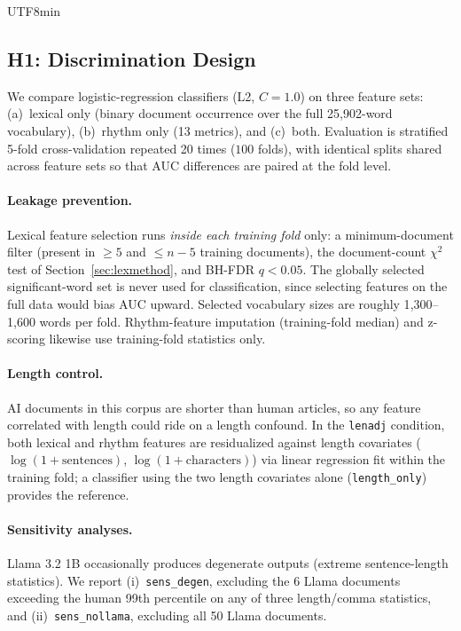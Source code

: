 \documentclass[11pt,a4paper]{article}
\begin{document}
\begin{CJK}{UTF8}{min}
\subsection{H1: Discrimination Design}
\label{sec:h1method}

We compare logistic-regression classifiers (L2, $C=1.0$) on three feature sets: (a)~lexical only (binary document occurrence over the full 25{,}902-word vocabulary), (b)~rhythm only (13 metrics), and (c)~both. Evaluation is stratified 5-fold cross-validation repeated 20 times ($100$ folds), with identical splits shared across feature sets so that AUC differences are paired at the fold level.

\paragraph{Leakage prevention.} Lexical feature selection runs \emph{inside each training fold} only: a minimum-document filter (present in $\geq 5$ and $\leq n-5$ training documents), the document-count $\chi^2$ test of Section~\ref{sec:lexmethod}, and BH-FDR $q<0.05$. The globally selected significant-word set is never used for classification, since selecting features on the full data would bias AUC upward. Selected vocabulary sizes are roughly 1{,}300--1{,}600 words per fold. Rhythm-feature imputation (training-fold median) and z-scoring likewise use training-fold statistics only.

\paragraph{Length control.} AI documents in this corpus are shorter than human articles, so any feature correlated with length could ride on a length confound. In the \texttt{lenadj} condition, both lexical and rhythm features are residualized against length covariates ($\log(1+\text{sentences})$, $\log(1+\text{characters})$) via linear regression fit within the training fold; a classifier using the two length covariates alone (\texttt{length\_only}) provides the reference.

\paragraph{Sensitivity analyses.} Llama 3.2 1B occasionally produces degenerate outputs (extreme sentence-length statistics). We report (i)~\texttt{sens\_degen}, excluding the 6 Llama documents exceeding the human 99th percentile on any of three length/comma statistics, and (ii)~\texttt{sens\_nollama}, excluding all 50 Llama documents.


\end{CJK}
\end{document}

